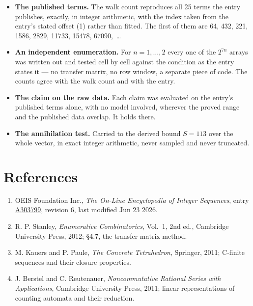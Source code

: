 \documentclass[11pt]{article}
\theoremstyle{definition}
\begin{document}
\begin{itemize}

\item {\bfseries The published terms.} The walk count reproduces all 25 terms the entry publishes, exactly, in integer arithmetic, with the index taken from the entry's stated offset (1) rather than fitted. The first of them are 64, 432, 221, 1586, 2829, 11733, 15478, 67090,~\dots

\item {\bfseries An independent enumeration.} For $n = 1,\dots,2$ every one of the $2^{7n}$ arrays was written out and tested cell by cell against the condition as the entry states it --- no transfer matrix, no row window, a separate piece of code. The counts agree with the walk count and with the entry.

\item {\bfseries The claim on the raw data.} Each claim was evaluated on the entry's published terms alone, with no model involved, wherever the proved range and the published data overlap. It holds there.

\item {\bfseries The annihilation test.} Carried to the derived bound $S = 113$ over the whole vector, in exact integer arithmetic, never sampled and never truncated.

\end{itemize}

\section{References}

\begin{enumerate}

\item OEIS Foundation Inc., \emph{The On-Line Encyclopedia of Integer Sequences}, entry \href{https://oeis.org/A303799}{A303799}, revision 6, last modified Jun 23 2026.

\item R. P. Stanley, \emph{Enumerative Combinatorics}, Vol.~1, 2nd ed., Cambridge University Press, 2012; \S4.7, the transfer-matrix method.

\item M. Kauers and P. Paule, \emph{The Concrete Tetrahedron}, Springer, 2011; C-finite sequences and their closure properties.

\item J. Berstel and C. Reutenauer, \emph{Noncommutative Rational Series with Applications}, Cambridge University Press, 2011; linear representations of counting automata and their reduction.

\end{enumerate}
\end{document}
